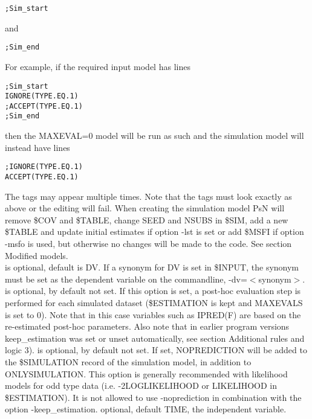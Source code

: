 \begin{optionlist}
\begin{verbatim}
;Sim_start
\end{verbatim}
and 
\begin{verbatim}
;Sim_end
\end{verbatim}
For example, if the required input model has lines
\begin{verbatim}
;Sim_start 
IGNORE(TYPE.EQ.1)
;ACCEPT(TYPE.EQ.1) 
;Sim_end
\end{verbatim}
then the MAXEVAL=0 model will be run as such and the simulation model will instead have lines
\begin{verbatim}
;IGNORE(TYPE.EQ.1)
ACCEPT(TYPE.EQ.1) 
\end{verbatim}
The tags may appear multiple times. Note that the tags must look exactly  as above or the editing will fail. When creating the simulation model PsN will remove \$COV and \$TABLE, change SEED and NSUBS in \$SIM, add a new \$TABLE and  update initial estimates if option -lst is set or add \$MSFI if option -msfo is used, but otherwise no changes will be made to the code. See section Modified models.\\
\nextopt
{}
is optional, default is DV. If a synonym for DV is set in \$INPUT, the synonym must be set as the dependent variable on the commandline, -dv=$<$synonym$>$. 
\nextopt
{}
is optional, by default not set. If this option is set, a post-hoc evaluation step is performed for each simulated dataset (\$ESTIMATION is kept and MAXEVALS is set to 0). Note that in this case variables such as IPRED(F) are based on the re-estimated post-hoc parameters. Also note that in earlier program versions keep\_estimation was set or unset automatically, see section Additional rules and logic 3). 
\nextopt
{}
is optional, by default not set. If set, NOPREDICTION will be added to the \$SIMULATION record of the simulation model, in addition to ONLYSIMULATION. This option is generally recommended with likelihood models for odd type data (i.e. -2LOGLIKELIHOOD or LIKELIHOOD in \$ESTIMATION). It is not allowed to use -noprediction in combination with the option \mbox{-keep\_estimation}. 
\nextopt
{}
optional, default TIME, the independent variable. 
\nextopt
{}

\end{optionlist}
